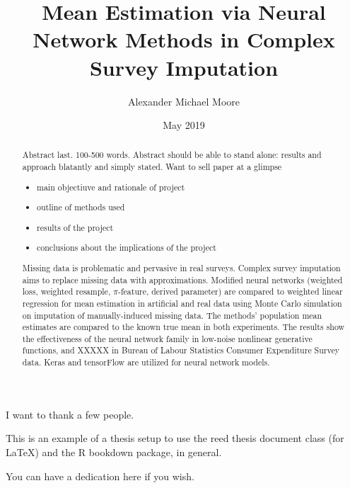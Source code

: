 \documentclass[12pt,twoside]{reedthesis}
\title{Mean Estimation via Neural Network Methods in Complex Survey Imputation}
\author{Alexander Michael Moore}
\date{May 2019}
\providecommand{\tightlist}{%
  \setlength{\itemsep}{0pt}\setlength{\parskip}{0pt}}
\begin{document}
  \maketitle

\frontmatter %
\pagestyle{empty} %
  \begin{acknowledgements}
    I want to thank a few people.
  \end{acknowledgements}
  \begin{preface}
    This is an example of a thesis setup to use the reed thesis document
    class (for LaTeX) and the R bookdown package, in general.
  \end{preface}
  \hypersetup{linkcolor=black}
  \setcounter{tocdepth}{2}
  \tableofcontents

  \listoftables

  \listoffigures
  \begin{abstract}
    Abstract last. 100-500 words. Abstract should be able to stand alone:
    results and approach blatantly and simply stated. Want to sell paper at
    a glimpse
    \begin{itemize}
    \tightlist
    \item
      main objectiuve and rationale of project
    \item
      outline of methods used
    \item
      results of the project
    \item
      conclusions about the implications of the project
    \end{itemize}
    Missing data is problematic and pervasive in real surveys. Complex
    survey imputation aims to replace missing data with approximations.
    Modified neural networks (weighted loss, weighted resample,
    \(\pi\)-feature, derived parameter) are compared to weighted linear
    regression for mean estimation in artificial and real data using Monte
    Carlo simulation on imputation of manually-induced missing data. The
    methods' population mean estimates are compared to the known true mean
    in both experiments. The results show the effectiveness of the neural
    network family in low-noise nonlinear generative functions, and XXXXX in
    Bureau of Labour Statistics Consumer Expenditure Survey data. Keras and
    tensorFlow are utilized for neural network models.
  \end{abstract}
  \begin{dedication}
    You can have a dedication here if you wish.
  \end{dedication}
\mainmatter %
\pagestyle{fancyplain} %
\end{document}
